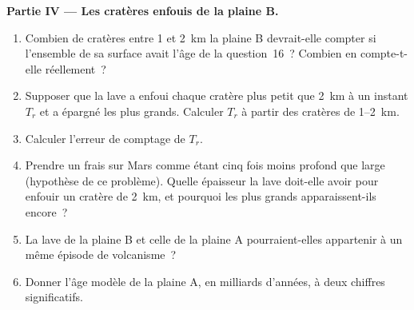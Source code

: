 \begin{problem}
\medskip\noindent\textbf{Partie IV --- Les cratères enfouis de la plaine B.}
\begin{enumerate}[resume]
\item Combien de cratères entre 1 et \qty{2}{km} la plaine B devrait-elle compter si
  l'ensemble de sa surface avait l'âge de la question~16~? Combien en compte-t-elle réellement~?
\item Supposer que la lave a enfoui chaque cratère plus petit que \qty{2}{km} à un
  instant $T_r$ et a épargné les plus grands. Calculer $T_r$ à partir des
  cratères de \num{1}--\qty{2}{km}.
\item Calculer l'erreur de comptage de $T_r$.
\item Prendre un  frais sur Mars comme étant cinq fois moins profond que large
  (hypothèse de ce problème). Quelle épaisseur la lave doit-elle avoir pour enfouir un
  cratère de \qty{2}{km}, et pourquoi les plus grands apparaissent-ils encore~?
\item La lave de la plaine B et celle de la plaine A pourraient-elles appartenir
  à un même épisode de volcanisme~?
\item Donner l'âge modèle de la plaine A, en milliards d'années, à deux
  chiffres significatifs.
\end{enumerate}
\end{problem}
